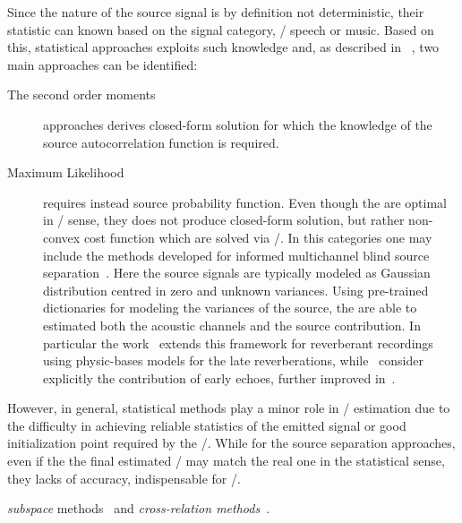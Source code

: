 \mynewline
Since the nature of the source signal is by definition not deterministic, their statistic can known based on the signal category, \eg/ speech or music.
Based on this, statistical approaches exploits such knowledge and, as described in ~, two main approaches can be identified:
\begin{description}
    \item[The second order moments] approaches derives closed-form solution for which the knowledge of the source autocorrelation function is required.
    \item[Maximum Likelihood] requires instead source probability function.
    Even though the are optimal in \ML/ sense, they does not produce closed-form solution, but rather non-convex cost function which are solved via \EM/.
    In this categories one may include the methods developed for informed multichannel blind source separation~.
    Here the source signals are typically modeled as Gaussian distribution centred in zero and unknown variances.
    Using pre-trained dictionaries for modeling the variances of the source, the are able to estimated both the acoustic channels and the source contribution.
    In particular the work~ extends this framework for reverberant recordings using physic-bases models for the late reverberations, while~ consider explicitly the contribution of early echoes, further improved in~.
\end{description}
However, in general, statistical methods play a minor role in \RIR/ estimation due to the difficulty in achieving reliable statistics of the emitted signal or good initialization point required by the \EM/.
While for the source separation approaches, even if the the final estimated \RIRs/ may match the real one in the statistical sense, they lacks of accuracy, indispensable for \AER/.

 \textit{subspace} methods~ and \textit{cross-relation methods}~.

